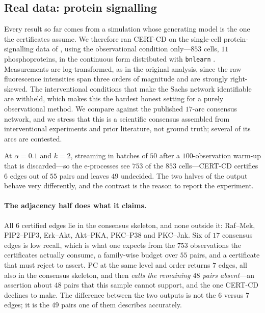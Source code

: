 
\subsection{Real data: protein signalling}\label{sec:exp-sachs}

Every result so far comes from a simulation whose generating model is the one
the certificates assume. We therefore ran CERT-CD on the single-cell
protein-signalling data of \citet{sachs2005causal}, using the observational
condition only---$853$ cells, $11$ phosphoproteins, in the continuous form
distributed with \texttt{bnlearn} \citep{scutari2010learning}. Measurements
are log-transformed, as in the original analysis, since the raw fluorescence
intensities span three orders of magnitude and are strongly right-skewed. The
interventional conditions that make the Sachs network identifiable are
withheld, which makes this the hardest honest setting for a purely
observational method. We compare against the published $17$-arc consensus
network, and we stress that this is a scientific consensus assembled from
interventional experiments and prior literature, not ground truth; several of
its arcs are contested.

At $\alpha = 0.1$ and $k = 2$, streaming in batches of $50$ after a
$100$-observation warm-up that is discarded---so the e-processes see $753$
of the $853$ cells---CERT-CD certifies
$6$ edges out of $55$ pairs and leaves $49$ undecided. The two halves of the
output behave very differently, and the contrast is the reason to report the
experiment.

\paragraph{The adjacency half does what it claims.} All $6$ certified edges
lie in the consensus skeleton, and none outside it: Raf--Mek, PIP2--PIP3,
Erk--Akt, Akt--PKA, PKC--P38 and PKC--Jnk. Six of $17$ consensus edges is low
recall, which is what one expects from the $753$ observations the
certificates actually consume, a family-wise
budget over $55$ pairs, and a certificate that must reject to assert. PC at
the same level and order returns $7$ edges, all also in the consensus
skeleton, and then \emph{calls the remaining $48$ pairs absent}---an assertion
about $48$ pairs that this sample cannot support, and the one CERT-CD declines
to make. The difference between the two outputs is not the $6$ versus $7$
edges; it is the $49$ pairs one of them describes accurately.

